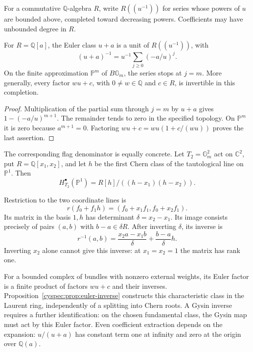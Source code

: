 For a commutative $\mathbb Q$-algebra $R$, write $R((u^{-1}))$ for series
whose powers of $u$ are bounded above, completed toward decreasing
powers. Coefficients may have unbounded degree in $R$.

\begin{proposition}\label{cyspec:prop:euler-inverse}
For $R=\mathbb Q[a]$, the Euler class $u+a$ is a unit of
$R((u^{-1}))$, with
\begin{equation}\label{cyspec:eq:euler-inverse}
 (u+a)^{-1}=u^{-1}\sum_{j\geq0}(-a/u)^j.
\end{equation}
On the finite approximation $\mathbb P^m$ of $B\mathbb G_m$, the
series stops at $j=m$. More generally, every factor $wu+c$, with
$0\ne w\in\mathbb Q$ and $c\in R$, is invertible in this completion.
\end{proposition}

\begin{proof}
Multiplication of the partial sum through $j=m$ by $u+a$ gives
$1-(-a/u)^{m+1}$. The remainder tends to zero in the specified
topology. On $\mathbb P^m$ it is zero because $a^{m+1}=0$.
Factoring $wu+c=wu(1+c/(wu))$ proves the last assertion.
\end{proof}

The corresponding flag denominator is equally concrete.
Let $T_2=\mathbb G_m^2$ act on $\mathbb C^2$, put
$R=\mathbb Q[x_1,x_2]$, and let $h$ be the first Chern class of
the tautological line on $\mathbb P^1$. Then
\[
 H_{T_2}^\bullet(\mathbb P^1)=R[h]/((h-x_1)(h-x_2)).
\]

Restriction to the two coordinate lines is
\[
 r(f_0+f_1h)=(f_0+x_1f_1,f_0+x_2f_1).
\]
Its matrix in the basis $1,h$ has determinant $\delta=x_2-x_1$.
Its image consists precisely of pairs $(a,b)$ with $b-a\in\delta R$.
After inverting $\delta$, its inverse is
\begin{equation}\label{cyspec:eq:flag-inverse}
 r^{-1}(a,b)=\frac{x_2a-x_1b}{\delta}+\frac{b-a}{\delta}h.
\end{equation}
Inverting $x_2$ alone cannot give this inverse: at $x_1=x_2=1$
the matrix has rank one.

For a bounded complex of bundles with nonzero external weights,
its Euler factor is a finite product of factors $wu+c$ and their
inverses. Proposition~\ref{cyspec:prop:euler-inverse} constructs this
characteristic class in the Laurent ring, independently of a
splitting into Chern roots. A Gysin inverse requires a further
identification: on the chosen fundamental class, the Gysin map
must act by this Euler factor.
Even coefficient extraction depends on the expansion: $u/(u+a)$
has constant term one at infinity and zero at the origin over
$\mathbb Q(a)$.

